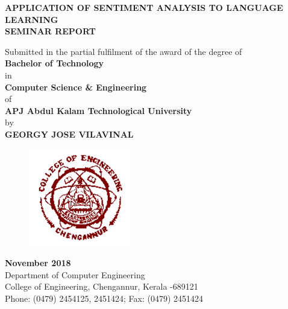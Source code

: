 \documentclass[a4paper,12pt,oneside]{article}
\begin{document}
\thispagestyle{empty}
\begin{center}

\large{\textbf{{APPLICATION OF SENTIMENT ANALYSIS TO LANGUAGE LEARNING}}}
\setlength{\baselineskip}{1.5\baselineskip}
\\
\vspace{5mm}
\textbf{SEMINAR REPORT}

Submitted in the partial fulfilment of the award of the degree
of
\\
\textbf{Bachelor of Technology}
\\
in
\\
\textbf{Computer Science \& Engineering}
\\
of
\\
\textbf{APJ Abdul Kalam Technological University}
\\
by
\\
\textbf{GEORGY JOSE VILAVINAL}
\\
\vspace{5mm}
\begin{figure}[H]
\centering
\includegraphics{ceclogo.png}
\end{figure}
\textbf{November 2018}
\vspace{8mm}
\\
Department of Computer Engineering
\\
College of Engineering, Chengannur, Kerala -689121
\\
Phone: (0479) 2454125, 2451424; Fax: (0479) 2451424
\\
\end{center}
\end{document}
